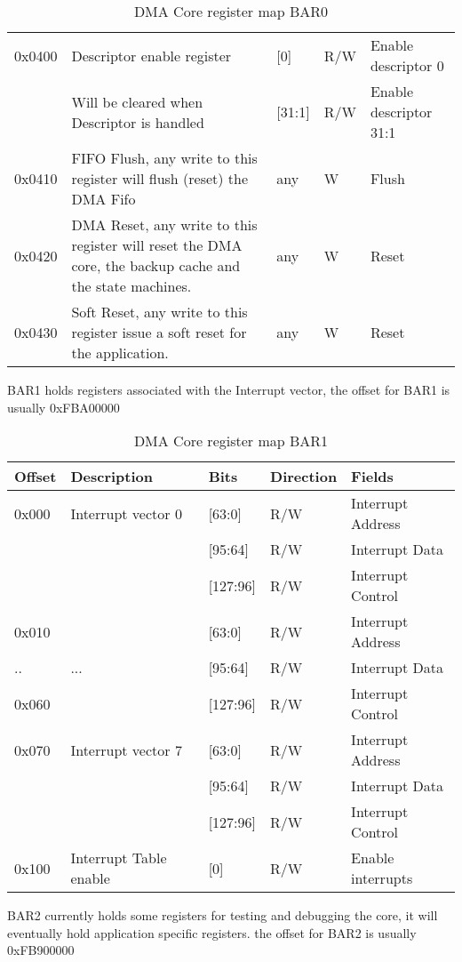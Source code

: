 \begin{table}[H]
\begin{tabularx}{\textwidth}{|l|X|l|l|l|}
	0x0400 & Descriptor enable register & [0] & R/W & Enable descriptor 0 \\
	& Will be cleared when Descriptor is handled& [31:1] & R/W & Enable descriptor 31:1\\
	\hline
	0x0410 & FIFO Flush, any write to this register will flush (reset) the DMA Fifo & any & W & Flush \\
	\hline
	0x0420 & DMA Reset, any write to this register will reset the DMA core, the backup cache and the state machines. & any & W & Reset \\
	\hline
	0x0430 & Soft Reset, any write to this register issue a soft reset for the application. & any & W & Reset \\
	\hline	\end{tabularx}
	\caption{DMA Core register map BAR0}\label{tab:dma_register_map_bar0}
\end{table}
\newpage
BAR1 holds registers associated with the Interrupt vector, the offset for BAR1 is usually 0xFBA00000
\begin{table}[H]
	\centering
	\begin{tabularx}{\textwidth}{|l|X|l|l|l|}
	\hline
	\textbf{Offset} & \textbf{Description} &\textbf{Bits}&\textbf{Direction}& \textbf{Fields}\\
	\hline
	0x000 & Interrupt vector 0 & [63:0] & R/W & Interrupt Address \\
	      &                     & [95:64] & R/W & Interrupt Data \\
	      &                     & [127:96] & R/W & Interrupt Control\\
	\hline	
	0x010 &  & [63:0] & R/W & Interrupt Address \\
	.. & ... & [95:64] & R/W & Interrupt Data \\
	0x060 &  & [127:96] & R/W & Interrupt Control\\
	\hline	
	0x070 & Interrupt vector 7& [63:0] & R/W & Interrupt Address \\
		      &                & [95:64] & R/W & Interrupt Data \\
		      &                & [127:96] & R/W & Interrupt Control\\
	\hline	
	0x100 & Interrupt Table enable & [0] & R/W & Enable interrupts \\
	\hline
	\end{tabularx}
	\caption{DMA Core register map BAR1}\label{tab:dma_register_map_bar1}
\end{table}

BAR2 currently holds some registers for testing and debugging the core, it will eventually hold application specific registers. the offset for BAR2 is usually 0xFB900000

